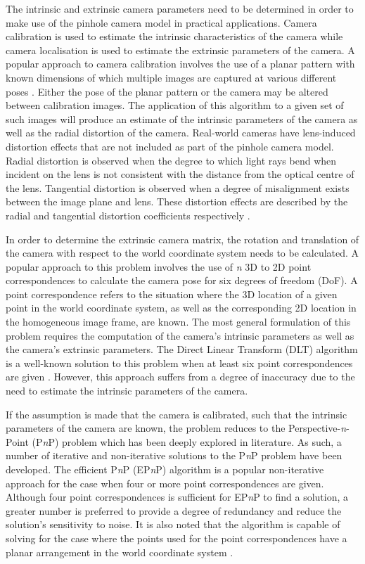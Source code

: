 The intrinsic and extrinsic camera parameters need to be determined in order to make use of the pinhole camera model in practical applications. Camera calibration is used to estimate the intrinsic characteristics of the camera while camera localisation is used to estimate the extrinsic parameters of the camera. A popular approach to camera calibration involves the use of a planar pattern with known dimensions of which multiple images are captured at various different poses \cite{Zhang:A_Flexible_Camera_Calibration_Technique}. Either the pose of the planar pattern or the camera may be altered between calibration images. The application of this algorithm to a given set of such images will produce an estimate of the intrinsic parameters of the camera as well as the radial distortion of the camera. Real-world cameras have lens-induced distortion effects that are not included as part of the pinhole camera model. Radial distortion is observed when the degree to which light rays bend when incident on the lens is not consistent with the distance from the optical centre of the lens. Tangential distortion is observed when a degree of misalignment exists between the image plane and lens. These distortion effects are described by the radial and tangential distortion coefficients respectively \cite{MathWorks:Camera_Calibration}.

In order to determine the extrinsic camera matrix, the rotation and translation of the camera with respect to the world coordinate system needs to be calculated. A popular approach to this problem involves the use of \textit{n} 3D to 2D point correspondences to calculate the camera pose for six degrees of freedom (DoF). A point correspondence refers to the situation where the 3D location of a given point in the world coordinate system, as well as the corresponding 2D location in the homogeneous image frame, are known. The most general formulation of this problem requires the computation of the camera's intrinsic parameters as well as the camera's extrinsic parameters. The Direct Linear Transform (DLT) algorithm is a well-known solution to this problem when at least six point correspondences are given \cite{OpenCV:Textured_Object_Pose_Estimation}. However, this approach suffers from a degree of inaccuracy due to the need to estimate the intrinsic parameters of the camera.

If the assumption is made that the camera is calibrated, such that the intrinsic parameters of the camera are known, the problem reduces to the Perspective-\textit{n}-Point (P\textit{n}P) problem which has been deeply explored in literature. As such, a number of iterative and non-iterative solutions to the P\textit{n}P problem have been developed. The efficient P\textit{n}P (EP\textit{n}P) algorithm is a popular non-iterative approach for the case when four or more point correspondences are given. Although four point correspondences is sufficient for EP\textit{n}P to find a solution, a greater number is preferred to provide a degree of redundancy and reduce the solution's sensitivity to noise. It is also noted that the algorithm is capable of solving for the case where the points used for the point correspondences have a planar arrangement in the world coordinate system \cite{Lepetit:EPnP}.

